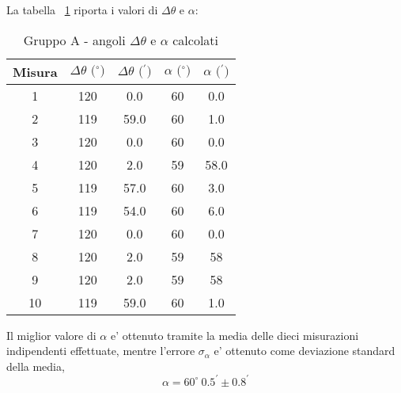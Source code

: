 La tabella ~\ref{table:tbl2} riporta i valori di $\Delta \theta$ e $\alpha$:
\begin{table}[!htbp]
    {\par\centering
    \begin{tabular}{ccccc}
        \hline
        Misura & $\Delta \theta \text{ ($^{\circ}$)}$ & $\Delta \theta \text{ ($^{\prime}$)}$ & $\alpha \text{ ($^{\circ}$)}$ & $\alpha \text{ ($^{\prime}$)}$\\
        \hline
        1   &   120 &   0.0     &   60  &   0.0\\
        2   &   119 &   59.0    &   60  &   1.0\\
        3   &   120 &   0.0     &   60  &   0.0\\
        4   &   120 &   2.0     &   59  &   58.0\\
        5   &   119 &   57.0    &   60  &   3.0\\
        6   &   119 &   54.0    &   60  &   6.0\\
        7   &   120 &   0.0     &   60  &   0.0\\
        8   &   120 &   2.0     &   59  &   58\\
        9   &   120 &   2.0     &   59  &   58\\
        10  &   119 &   59.0    &   60  &   1.0\\
        \hline
    \end{tabular}
    \par}
    \caption{Gruppo A - angoli $\Delta \theta$ e $\alpha$ calcolati} \label{table:tbl2}
\end{table}

Il miglior valore di $\alpha$ e' ottenuto tramite la media delle dieci misurazioni indipendenti effettuate, mentre l'errore $\sigma_{\alpha}$ e' ottenuto come deviazione standard della media,
\[
    \alpha = 60^{\circ} \ 0.5^{\prime} \pm 0.8^{\prime}
\]

